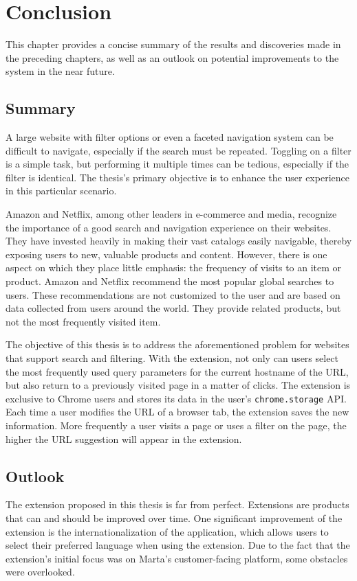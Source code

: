 \newpage
\chapter{Conclusion}
This chapter provides a concise summary of the results and discoveries made in the preceding chapters, as well as an outlook on potential improvements to the system in the near future.

\section{Summary}
A large website with filter options or even a faceted navigation system can be difficult to navigate, especially if the search must be repeated. Toggling on a filter is a simple task, but performing it multiple times can be tedious, especially if the filter is identical. The thesis's primary objective is to enhance the user experience in this particular scenario.

Amazon and Netflix, among other leaders in e-commerce and media, recognize the importance of a good search and navigation experience on their websites. They have invested heavily in making their vast catalogs easily navigable, thereby exposing users to new, valuable products and content. However, there is one aspect on which they place little emphasis: the frequency of visits to an item or product. Amazon and Netflix recommend the most popular global searches to users. These recommendations are not customized to the user and are based on data collected from users around the world. They provide related products, but not the most frequently visited item.

The objective of this thesis is to address the aforementioned problem for websites that support search and filtering. With the extension, not only can users select the most frequently used query parameters for the current hostname of the URL, but also return to a previously visited page in a matter of clicks. The extension is exclusive to Chrome users and stores its data in the user's \texttt{chrome.storage} API. Each time a user modifies the URL of a browser tab, the extension saves the new information. More frequently a user visits a page or uses a filter on the page, the higher the URL suggestion will appear in the extension.

\section{Outlook}
The extension proposed in this thesis is far from perfect. Extensions are products that can and should be improved over time. One significant improvement of the extension is the internationalization of the application, which allows users to select their preferred language when using the extension. Due to the fact that the extension's initial focus was on Marta's customer-facing platform, some obstacles were overlooked.

